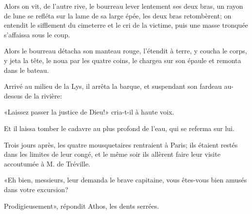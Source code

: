 Alors on vit, de l'autre rive, le bourreau lever lentement ses deux bras, un rayon de lune se refléta sur la lame de sa large épée, les deux bras retombèrent; on entendit le sifflement du cimeterre et le cri de la victime, puis une masse tronquée s'affaissa sous le coup. 

Alors le bourreau détacha son manteau rouge, l'étendit à terre, y coucha le corps, y jeta la tête, le noua par les quatre coins, le chargea sur son épaule et remonta dans le bateau. 

Arrivé au milieu de la Lys, il arrêta la barque, et suspendant son fardeau au-dessus de la rivière: 

«Laissez passer la justice de Dieu!» cria-t-il à haute voix. 

Et il laissa tomber le cadavre au plus profond de l'eau, qui se referma sur lui. 

Trois jours après, les quatre mousquetaires rentraient à Paris; ils étaient restés dans les limites de leur congé, et le même soir ils allèrent faire leur visite accoutumée à M. de Tréville. 

«Eh bien, messieurs, leur demanda le brave capitaine, vous êtes-vous bien amusés dans votre excursion? 

\speak  Prodigieusement», répondit Athos, les dents serrées. 